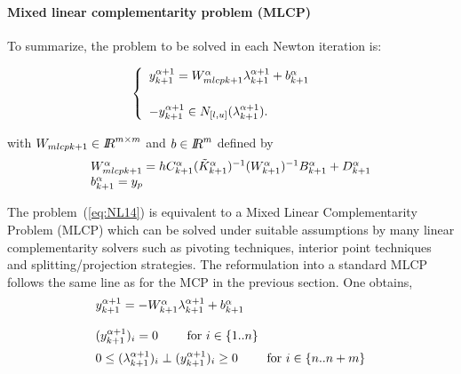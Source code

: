 \paragraph{Mixed linear complementarity problem (MLCP)}To summarize, the problem to be solved in each Newton iteration is:\\{
  \begin{minipage}[l]{1.0\linewidth}
    \begin{equation}
      \begin{cases}
      \begin{array}[l]{l}
        y^{\alpha+1}_{k+1} =   W_{mlcpk+1}^{\alpha}  \lambda^{\alpha+1}_{k+1} + b^{\alpha}_{k+1}
        \\ \\
        -y^{\alpha+1}_{k+1} \in N_{[l,u]}(\lambda^{\alpha+1}_{k+1} ). 
      \end{array}
      \label{eq:NL14}
      \end{cases}
    \end{equation}
  \end{minipage}
}
with $W_{mlcpk+1}\in \mbox{\rm $I\!\!R$}^{m\times m}$ and $b\in\mbox{\rm $I\!\!R$}^{m}$ defined by
\begin{equation}
  \label{eq:NL15}
 \begin{array}[l]{l}
   W_{mlcpk+1}^{\alpha} = h  C^{\alpha}_{k+1} (\tilde K^{\alpha}_{k+1})^{-1} (W^{\alpha}_{k+1})^{-1}  B^{\alpha}_{k+1} + D^{\alpha}_{k+1} \\
   b^{\alpha}_{k+1} = y_p
\end{array}
\end{equation}

The problem~(\ref{eq:NL14}) is equivalent to a Mixed Linear Complementarity Problem (MLCP) which can be solved under suitable assumptions by many linear complementarity solvers such as pivoting techniques, interior point techniques and splitting/projection strategies. The  reformulation into a standard MLCP follows the same line as for the MCP in the previous section. One obtains,
    \begin{equation}
      \begin{array}[l]{l}
        y^{\alpha+1}_{k+1} =   - W^{\alpha}_{k+1}  \lambda^{\alpha+1}_{k+1} + b^{\alpha}_{k+1}
        \\ \\
        (y^{\alpha+1}_{k+1})_i  = 0 \qquad \textrm{ for } i \in \{ 1..n\}\\[2mm]
        0 \leq  (\lambda^{\alpha+1}_{k+1})_i\perp (y^{\alpha+1}_{k+1})_i \geq 0 \qquad \textrm{ for } i \in \{ n..n+m\}\\
      \end{array}
      \label{eq:MLCP1} 
    \end{equation}



\clearpage


